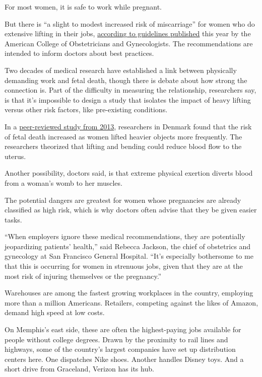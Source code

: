 For most women, it is safe to work while pregnant.

But there is ``a slight to modest increased risk of miscarriage'' for
women who do extensive lifting in their jobs,
\href{https://www.acog.org/Clinical-Guidance-and-Publications/Committee-Opinions/Committee-on-Obstetric-Practice/Employment-Considerations-During-Pregnancy-and-the-Postpartum-Period}{according
to guidelines published} this year by the American College of
Obstetricians and Gynecologists. The recommendations are intended to
inform doctors about best practices.

Two decades of medical research have established a link between
physically demanding work and fetal death, though there is debate about
how strong the connection is. Part of the difficulty in measuring the
relationship, researchers say, is that it's impossible to design a study
that isolates the impact of heavy lifting versus other risk factors,
like pre-existing conditions.

In a \href{https://www.ncbi.nlm.nih.gov/pubmed/23207454}{peer-reviewed
study from 2013}, researchers in Denmark found that the risk of fetal
death increased as women lifted heavier objects more frequently. The
researchers theorized that lifting and bending could reduce blood flow
to the uterus.

Another possibility, doctors said, is that extreme physical exertion
diverts blood from a woman's womb to her muscles.

The potential dangers are greatest for women whose pregnancies are
already classified as high risk, which is why doctors often advise that
they be given easier tasks.

``When employers ignore these medical recommendations, they are
potentially jeopardizing patients' health,'' said Rebecca Jackson, the
chief of obstetrics and gynecology at San Francisco General Hospital.
``It's especially bothersome to me that this is occurring for women in
strenuous jobs, given that they are at the most risk of injuring
themselves or the pregnancy.''

Warehouses are among the fastest growing workplaces in the country,
employing more than a million Americans. Retailers, competing against
the likes of Amazon, demand high speed at low costs.

On Memphis's east side, these are often the highest-paying jobs
available for people without college degrees. Drawn by the proximity to
rail lines and highways, some of the country's largest companies have
set up distribution centers here. One dispatches Nike shoes. Another
handles Disney toys. And a short drive from Graceland, Verizon has its
hub.

